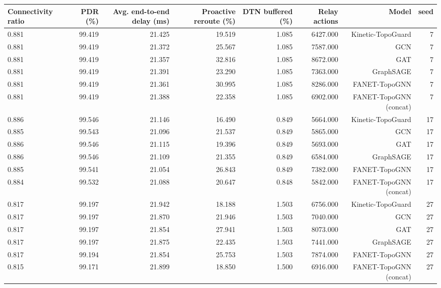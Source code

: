\begin{tabular}{lrrrrrrr}
\toprule
Connectivity ratio & PDR (\%) & Avg. end-to-end delay (ms) & Proactive reroute (\%) & DTN buffered (\%) & Relay actions & Model & seed \\
\midrule
0.881 & 99.419 & 21.425 & 19.519 & 1.085 & 6427.000 & Kinetic-TopoGuard & 7 \\
0.881 & 99.419 & 21.372 & 25.567 & 1.085 & 7587.000 & GCN & 7 \\
0.881 & 99.419 & 21.357 & 32.816 & 1.085 & 8672.000 & GAT & 7 \\
0.881 & 99.419 & 21.391 & 23.290 & 1.085 & 7363.000 & GraphSAGE & 7 \\
0.881 & 99.419 & 21.361 & 30.995 & 1.085 & 8286.000 & FANET-TopoGNN & 7 \\
0.881 & 99.419 & 21.388 & 22.358 & 1.085 & 6902.000 & FANET-TopoGNN (concat) & 7 \\
0.886 & 99.546 & 21.146 & 16.490 & 0.849 & 5664.000 & Kinetic-TopoGuard & 17 \\
0.885 & 99.543 & 21.096 & 21.537 & 0.849 & 5865.000 & GCN & 17 \\
0.886 & 99.546 & 21.115 & 19.396 & 0.849 & 5693.000 & GAT & 17 \\
0.886 & 99.546 & 21.109 & 21.355 & 0.849 & 6584.000 & GraphSAGE & 17 \\
0.885 & 99.541 & 21.054 & 26.843 & 0.849 & 7382.000 & FANET-TopoGNN & 17 \\
0.884 & 99.532 & 21.088 & 20.647 & 0.848 & 5842.000 & FANET-TopoGNN (concat) & 17 \\
0.817 & 99.197 & 21.942 & 18.188 & 1.503 & 6756.000 & Kinetic-TopoGuard & 27 \\
0.817 & 99.197 & 21.870 & 21.946 & 1.503 & 7040.000 & GCN & 27 \\
0.817 & 99.197 & 21.854 & 27.941 & 1.503 & 8073.000 & GAT & 27 \\
0.817 & 99.197 & 21.875 & 22.435 & 1.503 & 7441.000 & GraphSAGE & 27 \\
0.817 & 99.194 & 21.854 & 25.753 & 1.503 & 7874.000 & FANET-TopoGNN & 27 \\
0.815 & 99.171 & 21.899 & 18.850 & 1.500 & 6916.000 & FANET-TopoGNN (concat) & 27 \\
\bottomrule
\end{tabular}